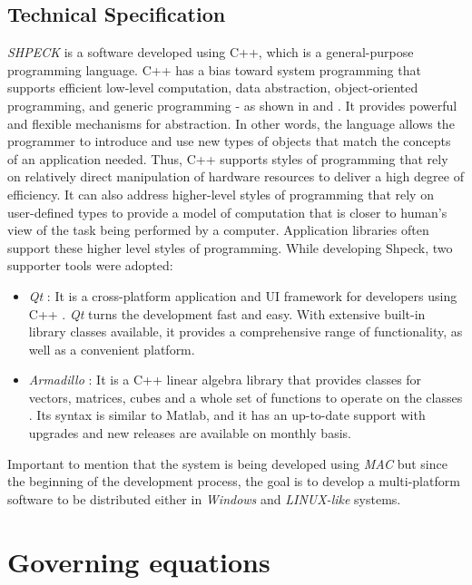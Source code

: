 \subsection{Technical Specification}
\emph{SHPECK} is a software developed using C++, which is a general-purpose programming language. C++ has a bias toward system programming that supports efficient low-level computation, data abstraction, object-oriented programming, and generic programming - as shown in \cite{Dale:04} and \cite{Stroustrup:97}. It provides powerful and flexible mechanisms for abstraction. In other words, the language allows the programmer to introduce and use new types of objects that match the concepts of an application needed. Thus, C++ supports styles of programming that rely on relatively direct manipulation of hardware resources to deliver a high degree of efficiency. It can also address higher-level styles of programming that rely on user-defined types to provide a model of computation that is closer to human's view of the task being performed by a computer. Application libraries often support these higher level styles of programming. While developing Shpeck, two supporter tools were adopted:
\begin{itemize}
\item \emph{Qt} : It is a cross-platform application and UI framework for developers using C++  \cite{Qt:14}. \emph{Qt} turns the development fast and easy. With extensive built-in library classes available, it provides a comprehensive range of functionality, as well as a convenient platform.
\item \emph{Armadillo} : It is a C++ linear algebra library that provides classes for vectors, matrices, cubes and a whole set of functions to operate on the classes \cite{arma:14}. Its syntax is similar to Matlab, and it has an up-to-date support with upgrades and new releases are available on monthly basis.
\end{itemize}
Important to mention that the system is being developed using \emph{MAC} but since the beginning of the development process, the goal is to develop a multi-platform software to be distributed either in \emph{Windows} and \emph{LINUX-like} systems.

\section{Governing equations}

